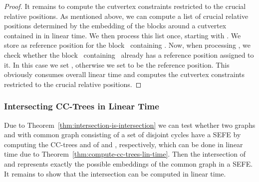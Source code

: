 \documentclass{scrartcl}
\newcommand{\1}[1]{{\normalfont \ensuremath{#1^{\tiny\circled{1}}}}} \newcommand{\2}[1]{{\normalfont \ensuremath{#1^{\tiny\circled{2}}}}} \renewcommand{\k}[1]{{\normalfont \ensuremath{#1^{\tiny\circled{k}}}}} \newcommand{\proj}[2]{\ensuremath{\left.#1\right|_{#2}}} \newcommand{\eps}{\varepsilon}
\theoremstyle{plain} \newtheorem{theorem}{Theorem} \newcounter{lemmacounter} \setcounter{lemmacounter}{0} \newtheorem{lemma}[lemmacounter]{Lemma} \newtheorem{fact}{Fact}  \newtheorem{corollary}{Corollary} \theoremstyle{definition} \newtheorem{definition}{Definition}
\begin{document}
\begin{proof}
  It remains to compute the cutvertex constraints restricted to the
  crucial relative positions.  As mentioned above, we can compute a
  list of crucial relative positions  determined by the embedding of the blocks around a
  cutvertex  contained in  in linear time.  We then process this
  list once, starting with .  We store  as
  reference position for the block~ containing .  Now, when
  processing , we check whether the block~
  containing~ already has a reference position 
  assigned to it.  In this case we set ,
  otherwise we set  to be the reference position.  This
  obviously consumes overall linear time and computes the cutvertex
  constraints restricted to the crucial relative positions.
\end{proof}



\subsubsection*{Intersecting CC-Trees in Linear Time}
\label{sec:inters-cc-trees-lin-time}

Due to Theorem~\ref{thm:intersection-is-intersection} we can test
whether two graphs  and  with common graph  consisting of
a set of disjoint cycles have a {\sc SEFE} by computing the
CC-trees  and  of  and ,
respectively, which can be done in linear time due to
Theorem~\ref{thm:compute-cc-trees-lin-time}.  Then the intersection
 of  and  represents
exactly the possible embeddings of the common graph  in a {\sc
  SEFE}.  It remains to show that the intersection can be computed in
linear time.
\end{document}
